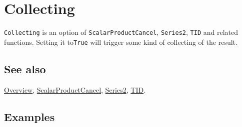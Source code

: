 \documentclass[../FeynCalcManual.tex]{subfiles}
\begin{document}
\hypertarget{collecting}{
\section{Collecting}\label{collecting}}

\texttt{Collecting} is an option of \texttt{ScalarProductCancel},
\texttt{Series2}, \texttt{TID} and related functions. Setting it
to\texttt{True} will trigger some kind of collecting of the result.

\subsection{See also}

\hyperlink{toc}{Overview},
\hyperlink{scalarproductcancel}{ScalarProductCancel},
\hyperlink{series2}{Series2}, \hyperlink{tid}{TID}.

\subsection{Examples}
\end{document}
